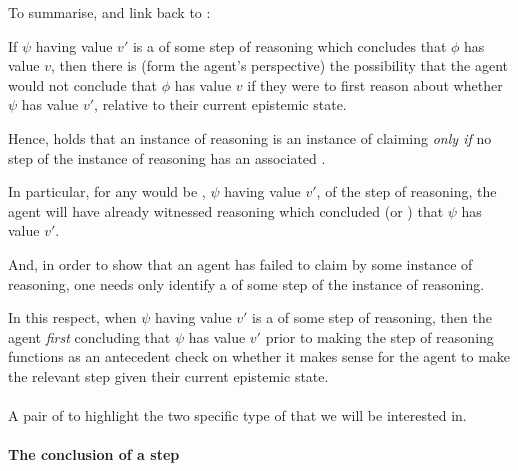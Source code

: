 \begin{note}[Summary]
  To summarise, and link back to \ideaCS{}:

  If \(\psi\) having value \(v'\) is a \requ{} of some step of reasoning which concludes that \(\phi\) has value \(v\), then there is (form the agent's perspective) the possibility that the agent would not conclude that \(\phi\) has value \(v\) if they were to first reason about whether \(\psi\) has value \(v'\), relative to their current epistemic state.

  Hence, \ideaCS{} holds that an instance of reasoning is an instance of claiming \support{} \emph{only if} no step of the instance of reasoning has an associated \requ{}.

  In particular, for any would be \requ{}, \(\psi\) having value \(v'\), of the step of reasoning, the agent will have already witnessed reasoning which concluded (or \indicateVed{}) that \(\psi\) has value \(v'\).

  And, in order to show that an agent has failed to claim \support{} by some instance of reasoning, one needs only identify a \requ{} of some step of the instance of reasoning.

  In this respect, when \(\psi\) having value \(v'\) is a \requ{} of some step of reasoning, then the agent \emph{first} concluding that \(\psi\) has value \(v'\) prior to making the step of reasoning functions as an antecedent check on whether it makes sense for the agent to make the relevant step given their current epistemic state.
\end{note}


\paragraph{}

\begin{note}
  A pair of  to highlight the two specific type of  that we will be interested in.
\end{note}

\paragraph*{The conclusion of a step}

